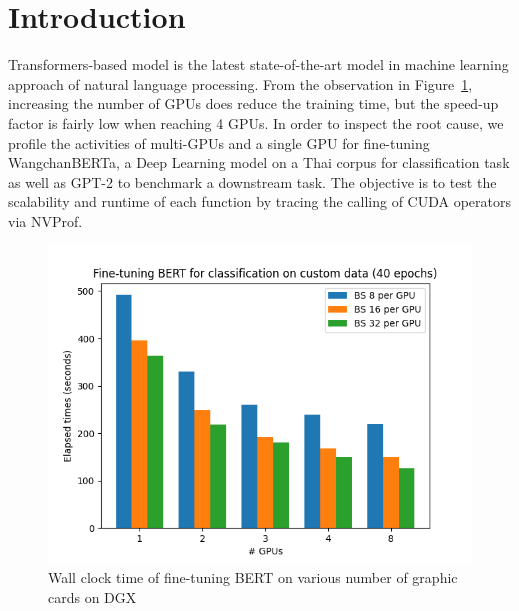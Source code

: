 \section{Introduction}

Transformers-based model is the latest state-of-the-art model in machine learning approach of natural language processing. From the observation in Figure~\ref{fig:bert_benchmark}, increasing the number of GPUs does reduce the training time, but the speed-up factor is fairly low when reaching 4 GPUs. In order to inspect the root cause, we profile the activities of multi-GPUs and a single GPU for fine-tuning WangchanBERTa, a Deep Learning model on a Thai corpus for classification task as well as GPT-2 to benchmark a downstream task. The objective is to test the scalability and runtime of each function by tracing the calling of CUDA operators via NVProf.

\begin{figure}[h!]
    \centering
    \includegraphics[width=0.7\columnwidth]{fig/benchmark_bybs_1.png}
    \caption{Wall clock time of fine-tuning BERT on various number of graphic cards on DGX}
    \label{fig:bert_benchmark}
\end{figure}




 
 

